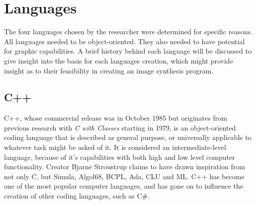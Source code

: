 \section{Languages}
The four languages chosen by the researcher were determined for specific reasons.  All languages needed to be object-oriented.  They also needed to have potential for graphic capabilities.  A brief history behind each language will be discussed to give insight into the basis for each languages creation, which might provide insight as to their feasibility in creating an image synthesis program.
\subsection{C++}
\label{sub:C++}
C++, whose commercial release was in October 1985\cite{stroustrup1996history} but originates from previous research with \textit{C with Classes} starting in 1979, is an object-oriented coding language that is described as general purpose, or universally applicable to whatever task might be asked of it.  It is considered an intermediate-level language, because of it's capabilities with both high and low level computer functionality.  Creator Bjarne Stroustrup claims to have drawn inspiration from not only C, but Simula, Algol68, BCPL, Ada, CLU and ML.  C++ has become one of the most popular computer languages, and has gone on to influence the creation of other coding languages, such as C\#\cite{naugler2007c}.

